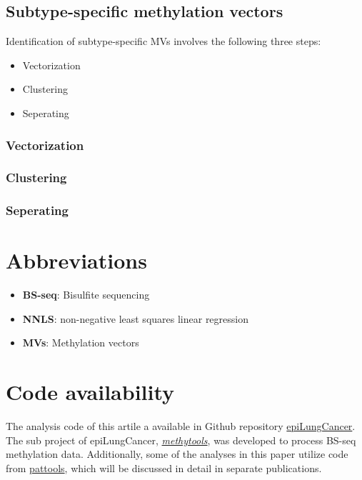 \documentclass[12pt,letterpaper]{article}
\begin{document}
\subsection{Subtype-specific methylation vectors}\label{sec:ssmv}

Identification of subtype-specific MVs involves the following three steps:

\begin{itemize}
    \item  Vectorization
    \item  Clustering
    \item  Seperating
\end{itemize}

\subsubsection{Vectorization}

\subsubsection{Clustering}

\subsubsection{Seperating}

\section{Abbreviations}\label{sec:abbr}

\begin{itemize}
    \item  \textbf{BS-seq}: Bisulfite sequencing
    \item  \textbf{NNLS}: non-negative least squares linear regression
    \item  \textbf{MVs}: Methylation vectors
\end{itemize}

\section{Code availability}\label{sec:code}

The analysis code of this artile a available in Github repository
\href{https://github.com/hcyvan/epiLungCancer}{epiLungCancer}. The sub project of epiLungCancer,
\href{https://github.com/hcyvan/epiLungCancer/tree/main/methytools}{\textit{methytools}},  was developed
to process BS-seq methylation data. Additionally, some of the analyses in this paper utilize code
from \href{https://github.com/hcyvan/pattools}{pattools}, which will be discussed in detail in
separate publications.




\end{document}
